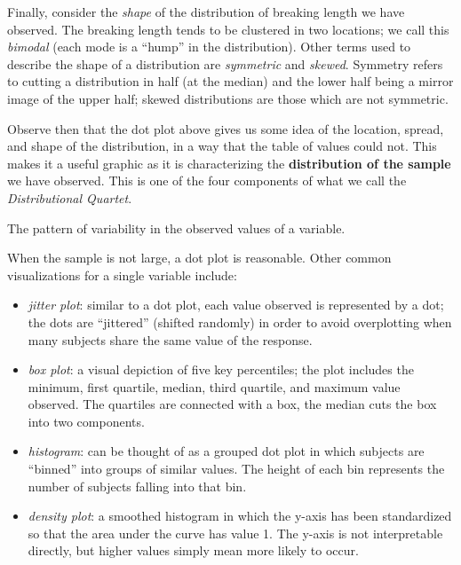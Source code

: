 \documentclass[]{book}
\providecommand{\tightlist}{%
  \setlength{\itemsep}{0pt}\setlength{\parskip}{0pt}}
\theoremstyle{plain}
\theoremstyle{mydefn}
\theoremstyle{myexmpl}
\theoremstyle{remark}
\let\BeginKnitrBlock\begin \let\EndKnitrBlock\end
\let\BeginKnitrBlock\begin \let\EndKnitrBlock\end
\begin{document}
Finally, consider the \emph{shape} of the distribution of breaking
length we have observed. The breaking length tends to be clustered in
two locations; we call this \emph{bimodal} (each mode is a ``hump'' in
the distribution). Other terms used to describe the shape of a
distribution are \emph{symmetric} and \emph{skewed}. Symmetry refers to
cutting a distribution in half (at the median) and the lower half being
a mirror image of the upper half; skewed distributions are those which
are not symmetric.

Observe then that the dot plot above gives us some idea of the location,
spread, and shape of the distribution, in a way that the table of values
could not. This makes it a useful graphic as it is characterizing the
\textbf{distribution of the sample} we have observed. This is one of the
four components of what we call the \emph{Distributional Quartet}.

\BeginKnitrBlock{definition}[Distribution of the Sample]
\protect\hypertarget{def:defn-distribution-sample}{}{\label{def:defn-distribution-sample}
{} }The pattern of variability
in the observed values of a variable.
\EndKnitrBlock{definition}

When the sample is not large, a dot plot is reasonable. Other common
visualizations for a single variable include:

\begin{itemize}
\tightlist
\item
  \emph{jitter plot}: similar to a dot plot, each value observed is
  represented by a dot; the dots are ``jittered'' (shifted randomly) in
  order to avoid overplotting when many subjects share the same value of
  the response.
\item
  \emph{box plot}: a visual depiction of five key percentiles; the plot
  includes the minimum, first quartile, median, third quartile, and
  maximum value observed. The quartiles are connected with a box, the
  median cuts the box into two components.
\item
  \emph{histogram}: can be thought of as a grouped dot plot in which
  subjects are ``binned'' into groups of similar values. The height of
  each bin represents the number of subjects falling into that bin.
\item
  \emph{density plot}: a smoothed histogram in which the y-axis has been
  standardized so that the area under the curve has value 1. The y-axis
  is not interpretable directly, but higher values simply mean more
  likely to occur.
\end{itemize}
\end{document}
